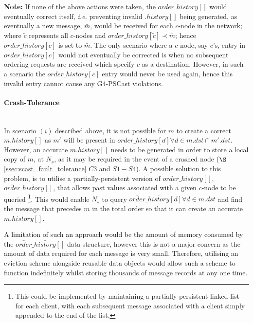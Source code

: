     \textbf{Note: } If none of the above actions were taken, the $order\_history[]$ would eventually correct itself, \emph{i.e.} preventing invalid $.history[]$ being generated, as eventually a new message, $\bar{m}$, would be received for each $c$-node in the network; where $\tilde{c}$ represents all $c$-nodes and $order\_history[\tilde{c}] \prec \bar{m}$; hence $order\_history[\tilde{c}]$ is set to $\bar{m}$.  The only scenario where a $c$-node, say $c$'s, entry in $order\_history[c]$ would not eventually be corrected is when no subsequent ordering requests are received which specify $c$ as a destination.  However, in such a scenario the $order\_history[c]$ entry would never be used again, hence this invalid entry cannot cause any G4-PSCast violations.  
    
    \paragraph{Crash-Tolerance} \hfill \\
    In scenario $(i)$ described above, it is not possible for $m$ to create a correct $m.history[]$ as $m'$ will be present in $order\_history[d] \forall d \in m.dst \cap m'.dst$.  However, an accurate $m.history[]$ needs to be generated in order to store a local copy of $m$, at $N_s$, as it may be required in the event of a crashed node ($\S$ \ref{ssec:scast_fault_tolerance} $C3$ and $S1-S4$).  A possible solution to this problem, is to utilise a partially-persistent version of $order\_history[]$, $\bar{order}\_\bar{history}[]$, that allows past values associated with a given $c$-node to be queried \footnote{This could be implemented by maintaining a partially-persistent linked list for each client, with each subsequent message associated with a client simply appended to the end of the list.}.  This would enable $N_s$ to query $\bar{order}\_\bar{history}[d] \forall d \in m.dst$ and find the message that precedes $m$ in the total order so that it can create an accurate $m.history[]$.
    
    A limitation of such an approach would be the amount of memory consumed by the $\bar{order}\_\bar{history}[]$ data structure, however this is not a major concern as the amount of data required for each message is very small.  Therefore, utilising an eviction scheme alongside reusable data objects would allow such a scheme to function indefinitely whilst storing thousands of message records at any one time.  

